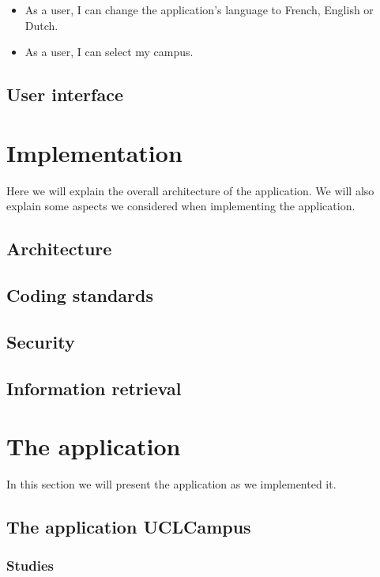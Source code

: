 \documentclass[11pt, a4paper]{report}
\begin{document}
\begin{itemize}
\item As a user, I can change the application's language to French, English or Dutch.
\item As a user, I can select my campus.
\end{itemize}

\section{User interface}

\chapter{Implementation}

Here we will explain the overall architecture of the application. We will also explain some aspects we considered when implementing the application.

\section{Architecture}

\section{Coding standards}

\section{Security}

\section{Information retrieval}
\newpage

\chapter{The application}

In this section we will present the application as we implemented it.

\section{The application UCLCampus}

\subsection{Studies}
\end{document}
